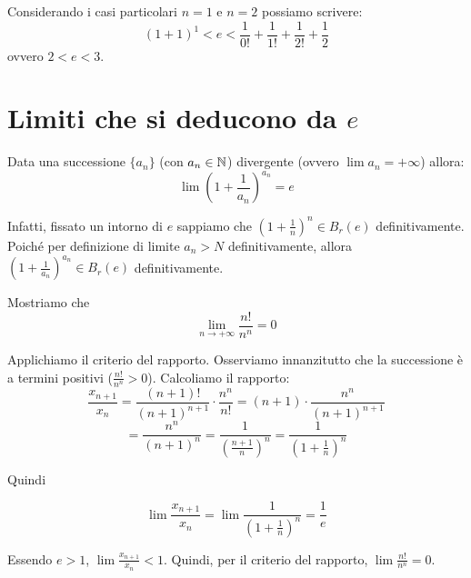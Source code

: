 Considerando i casi particolari $n = 1$ e $n = 2$ possiamo scrivere:
\begin{equation*}
(1+1)^1 < e < \frac{1}{0!} + \frac{1}{1!} + \frac{1}{2!} + \frac{1}{2}
\end{equation*}
ovvero $2 < e < 3$.

\section{Limiti che si deducono da $e$}

\begin{remark}
Data una successione $\{a_n\}$ (con $a_n \in \mathbb N$) divergente (ovvero $\lim a_n = +\infty$) allora:
\begin{equation*}
\lim \left(1 + \frac{1}{a_n}\right)^{a_n} = e
\end{equation*}

Infatti, fissato un intorno di $e$ sappiamo che $(1+\frac{1}{n})^n \in B_r(e)$ definitivamente. Poiché per definizione di limite $a_n > N$ definitivamente, allora $(1+\frac{1}{a_n})^{a_n} \in B_r(e)$ definitivamente.
\end{remark}

\begin{example}
Mostriamo che 
\begin{equation*}
\lim_{n \to +\infty} \frac{n!}{n^n} = 0
\end{equation*}

Applichiamo il criterio del rapporto. Osserviamo innanzitutto che la successione è a termini positivi ($\frac{n!}{n^n} > 0$). Calcoliamo il rapporto:
\begin{equation*}
\frac{x_{n+1}}{x_n} = \frac{(n+1)!}{(n+1)^{n+1}} \cdot \frac{n^n}{n!} = (n+1) \cdot \frac{n^n}{(n+1)^{n+1}}
\end{equation*}
\begin{equation*}
= \frac{n^n}{(n+1)^n} = \frac{1}{\left(\frac{n+1}{n}\right)^n} = \frac{1}{\left(1 + \frac{1}{n}\right)^n}
\end{equation*}

Quindi

\begin{equation*}
\lim \frac{x_{n+1}}{x_n} = \lim \frac{1}{\left(1 + \frac{1}{n} \right)^n} = \frac{1}{e}
\end{equation*}

Essendo $e > 1$, $\lim \frac{x_{n+1}}{x_n} < 1$. Quindi, per il criterio del rapporto, $\lim \frac{n!}{n^n} = 0$.
\end{example}


